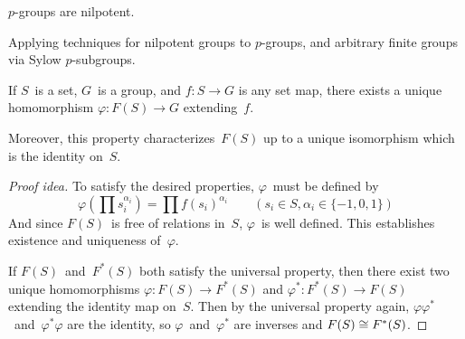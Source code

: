 \begin{cor}[\(p\)-groups]
\(p\)-groups are nilpotent.
\end{cor}
\begin{app}
Applying techniques for nilpotent groups to \(p\)-groups, and arbitrary finite groups via Sylow \(p\)-subgroups.
\end{app}

\begin{thm}
If \(S\)~is a set, \(G\)~is a group, and \(f:S\to G\) is any set map, there exists a unique homomorphism \(\varphi:F(S)\to G\) extending~\(f\).

Moreover, this property characterizes~\(F(S)\) up to a unique isomorphism which is the identity on~\(S\).
\end{thm}
\begin{proof}[Proof idea]
To satisfy the desired properties, \(\varphi\)~must be defined by
\[\varphi(\prod s_i^{\alpha_i})=\prod f(s_i)^{\alpha_i}\qquad(s_i\in S,\alpha_i\in\{-1,0,1\})\]
And since \(F(S)\)~is free of relations in~\(S\), \(\varphi\)~is well defined. This establishes existence and uniqueness of~\(\varphi\).

If \(F(S)\)~and~\(F^*(S)\) both satisfy the universal property, then there exist two unique homomorphisms \(\varphi:F(S)\to F^*(S)\) and \(\varphi^*:F^*(S)\to F(S)\) extending the identity map on~\(S\). Then by the universal property again, \(\varphi\varphi^*\)~and~\(\varphi^*\varphi\) are the identity, so \(\varphi\)~and~\(\varphi^*\) are inverses and \(F(S)\cong F^*(S)\).
\end{proof}

